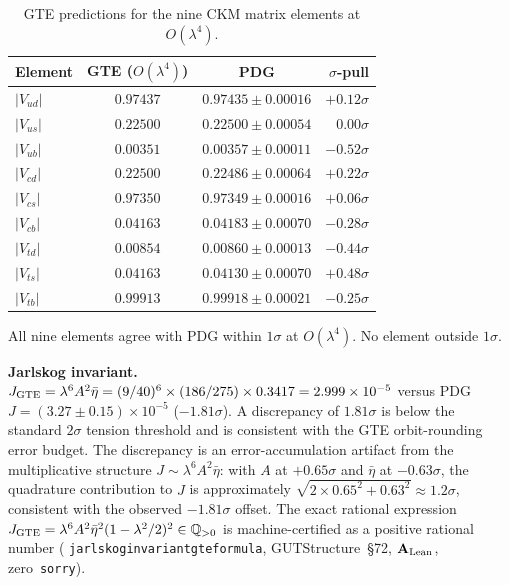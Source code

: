 \documentclass[11pt]{article}
\theoremstyle{remark}
\newcommand{\lean}[1]{%
  \penalty-100
  \begingroup\def\_{\textunderscore\allowbreak}\texttt{#1}\endgroup}
\newcommand{\lam}{\lambda}
\newcommand{\Ebar}{\bar{\eta}}
\newcommand{\CatAL}{\ensuremath{\textbf{A}_{\rm Lean}}}
\begin{document}
\begin{table}[H]
\centering
\caption{GTE predictions for the nine CKM matrix elements at $O(\lam^4)$.}
\label{tab:ckm_elements}
\small
\renewcommand{\arraystretch}{1.2}
\begin{tabular}{lccr}
\toprule
Element & GTE ($O(\lam^4)$) & PDG & $\sigma$-pull \\
\midrule
$|V_{ud}|$ & $0.97437$ & $0.97435\pm 0.00016$ & $+0.12\sigma$ \\
$|V_{us}|$ & $0.22500$ & $0.22500\pm 0.00054$ & $0.00\sigma$  \\
$|V_{ub}|$ & $0.00351$ & $0.00357\pm 0.00011$ & $-0.52\sigma$ \\
$|V_{cd}|$ & $0.22500$ & $0.22486\pm 0.00064$ & $+0.22\sigma$ \\
$|V_{cs}|$ & $0.97350$ & $0.97349\pm 0.00016$ & $+0.06\sigma$ \\
$|V_{cb}|$ & $0.04163$ & $0.04183\pm 0.00070$ & $-0.28\sigma$ \\
$|V_{td}|$ & $0.00854$ & $0.00860\pm 0.00013$ & $-0.44\sigma$ \\
$|V_{ts}|$ & $0.04163$ & $0.04130\pm 0.00070$ & $+0.48\sigma$ \\
$|V_{tb}|$ & $0.99913$ & $0.99918\pm 0.00021$ & $-0.25\sigma$ \\
\bottomrule
\end{tabular}
\end{table}

All nine elements agree with PDG within $1\sigma$ at $O(\lam^4)$.  No element outside $1\sigma$.

\medskip

\textbf{Jarlskog invariant.}
$J_{\rm GTE} = \lam^6 A^2 \Ebar
= (9/40)^6 \times (186/275) \times 0.3417
= 2.999\times 10^{-5}$
versus PDG $J = (3.27\pm 0.15)\times 10^{-5}$ ($-1.81\sigma$).
A discrepancy of $1.81\sigma$ is below the standard $2\sigma$ tension threshold and is
consistent with the GTE orbit-rounding error budget.
The discrepancy is an error-accumulation artifact from the multiplicative structure
$J \sim \lam^6 A^2 \Ebar$: with $A$ at $+0.65\sigma$ and $\Ebar$ at $-0.63\sigma$,
the quadrature contribution to $J$ is approximately $\sqrt{2\times 0.65^2+0.63^2}\approx 1.2\sigma$,
consistent with the observed $-1.81\sigma$ offset.
The exact rational expression $J_{\rm GTE} = \lambda^6 A^2 \bar\eta^2 (1-\lambda^2/2)^2 \in \mathbb{Q}_{>0}$
is machine-certified as a positive rational number
(\lean{jarlskog\_invariant\_gte\_formula}, GUTStructure~\S72, $\CatAL$, zero~\texttt{sorry}).
\end{document}

